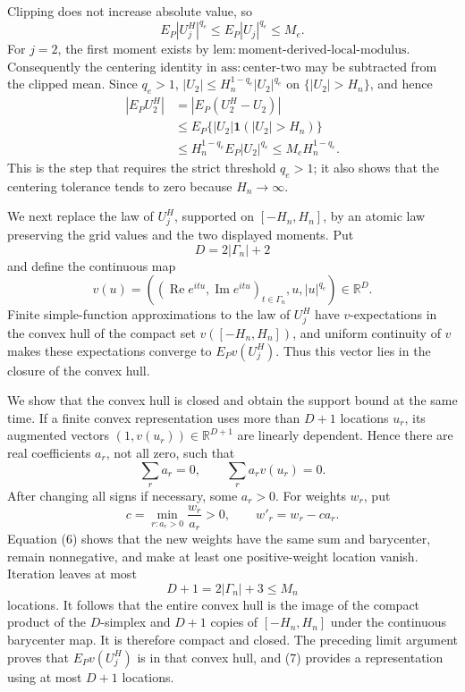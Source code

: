 Clipping does not increase absolute value, so
\[
 E_P|U_j^H|^{q_e}\le E_P|U_j|^{q_e}\le M_e.                       \tag{3}
\]
For \(j=2\), the first moment exists by
\(\mathrm{lem{:}moment\text{-}derived\text{-}local\text{-}modulus}\).
Consequently the centering identity in \(\mathrm{ass{:}center\text{-}two}\)
may be subtracted from the clipped mean.  Since \(q_e>1\),
\(|U_2|\le H_n^{1-q_e}|U_2|^{q_e}\) on \(\{|U_2|>H_n\}\), and hence
\[
 \begin{aligned}
 |E_PU_2^H|
 &=|E_P(U_2^H-U_2)|\\
 &\le E_P\{|U_2|\mathbf1(|U_2|>H_n)\}\\
 &\le H_n^{1-q_e}E_P|U_2|^{q_e}
 \le M_eH_n^{1-q_e}.                                               \tag{4}
 \end{aligned}
\]
This is the step that requires the strict threshold \(q_e>1\); it also
shows that the centering tolerance tends to zero because \(H_n\to\infty\).

We next replace the law of \(U_j^H\), supported on \([-H_n,H_n]\), by an
atomic law preserving the grid values and the two displayed moments.  Put
\[
 D=2|\Gamma_n|+2
\]
and define the continuous map
\[
 v(u)=\left(
 (\operatorname{Re}e^{itu},\operatorname{Im}e^{itu})_{t\in\Gamma_n},
 u,|u|^{q_e}\right)\in\mathbb R^D.                                \tag{5}
\]
Finite simple-function approximations to the law of \(U_j^H\) have
\(v\)-expectations in the convex hull of the compact set
\(v([-H_n,H_n])\), and uniform continuity of \(v\) makes these expectations
converge to \(E_Pv(U_j^H)\).  Thus this vector lies in the closure of the
convex hull.

We show that the convex hull is closed and obtain the support bound at the
same time.  If a finite convex representation uses more than \(D+1\)
locations \(u_r\), its augmented vectors
\((1,v(u_r))\in\mathbb R^{D+1}\) are linearly dependent.  Hence there are
real coefficients \(a_r\), not all zero, such that
\[
 \sum_ra_r=0,
 \qquad
 \sum_ra_rv(u_r)=0.                                                \tag{6}
\]
After changing all signs if necessary, some \(a_r>0\).  For weights \(w_r\),
put
\[
 c=\min_{r:a_r>0}\frac{w_r}{a_r}>0,
 \qquad w'_r=w_r-ca_r.
\]
Equation (6) shows that the new weights have the same sum and barycenter,
remain nonnegative, and make at least one positive-weight location vanish.
Iteration leaves at most
\[
 D+1=2|\Gamma_n|+3\le M_n                                         \tag{7}
\]
locations.  It follows that the entire convex hull is the image of the
compact product of the \(D\)-simplex and \(D+1\) copies of
\([-H_n,H_n]\) under the continuous barycenter map.  It is therefore compact
and closed.  The preceding limit argument proves that \(E_Pv(U_j^H)\) is in
that convex hull, and (7) provides a representation using at most \(D+1\)
locations.

